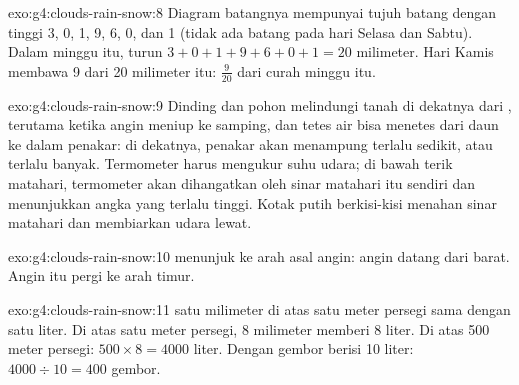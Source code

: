 \begin{solution}{exo:g4:clouds-rain-snow:8}
Diagram batangnya mempunyai tujuh batang dengan tinggi 3, 0, 1, 9, 6, 0,
dan 1 (tidak ada batang pada hari Selasa dan Sabtu). Dalam minggu itu,
turun $3 + 0 + 1 + 9 + 6 + 0 + 1 = 20$ milimeter. Hari Kamis membawa 9
dari 20 milimeter itu: $\frac{9}{20}$ dari curah  minggu itu.
\end{solution}

\begin{solution}{exo:g4:clouds-rain-snow:9}
Dinding dan pohon melindungi tanah di dekatnya dari , terutama ketika
angin meniup  ke samping, dan tetes air bisa menetes dari daun ke
dalam penakar: di dekatnya, penakar akan menampung terlalu sedikit, atau
terlalu banyak. Termometer harus mengukur suhu udara; di bawah terik
matahari, termometer akan dihangatkan oleh sinar matahari itu sendiri dan
menunjukkan angka yang terlalu tinggi. Kotak putih berkisi-kisi menahan
sinar matahari dan membiarkan udara lewat.
\end{solution}

\begin{solution}{exo:g4:clouds-rain-snow:10}
 menunjuk ke arah asal angin: angin datang dari barat.
Angin itu pergi ke arah timur.
\end{solution}

\begin{solution}{exo:g4:clouds-rain-snow:11}
 satu milimeter di atas satu meter persegi sama dengan satu liter. Di
atas satu meter persegi, 8 milimeter memberi 8 liter. Di atas 500 meter
persegi: $500 \times 8 = 4000$ liter. Dengan gembor berisi 10 liter:
$4000 \div 10 = 400$ gembor.
\end{solution}
